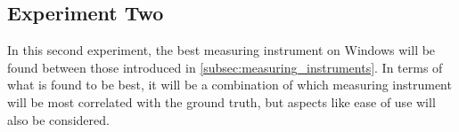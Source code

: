 \subsection{Experiment Two}\label{subsec:exp_two}

In this second experiment, the best measuring instrument on Windows will be found between those introduced in \cref{subsec:measuring_instruments}. In terms of what is found to be best, it will be a combination of which measuring instrument will be most correlated with the ground truth, but aspects like ease of use will also be considered.
